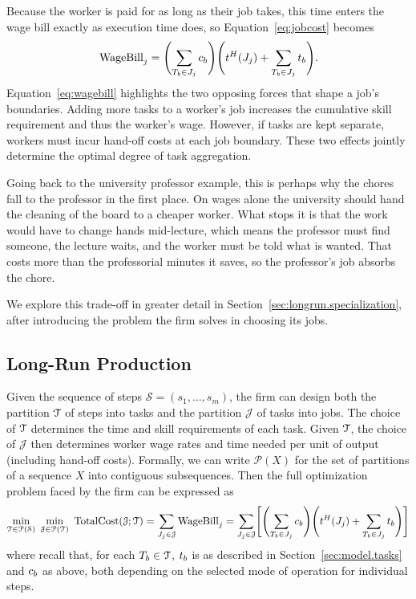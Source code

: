 Because the worker is paid for as long as their job takes, this time enters the wage bill exactly as execution time does, so Equation~\eqref{eq:jobcost} becomes
\begin{align}
\label{eq:wagebill}
\text{WageBill}_j = \Biggl(\sum_{T_b \in J_j} c_{b} \Biggr) \Biggl(t^{H}_{}(J_j) + \sum_{T_b \in J_j} t_{b} \Biggr).
\end{align}
Equation~\eqref{eq:wagebill} highlights the two opposing forces that shape a job's boundaries.
Adding more tasks to a worker's job increases the cumulative skill requirement and thus the worker's wage.
However, if tasks are kept separate, workers must incur hand-off costs at each job boundary.
These two effects jointly determine the optimal degree of task aggregation.

Going back to the university professor example, this is perhaps why the chores fall to the professor in the first place. On wages alone the university should hand the cleaning of the board to a cheaper worker. What stops it is that the work would have to change hands mid-lecture, which means the professor must find someone, the lecture waits, and the worker must be told what is wanted. That costs more than the professorial minutes it saves, so the professor's job absorbs the chore.

We explore this trade-off in greater detail in Section~\ref{sec:longrun.specialization}, after introducing the problem the firm solves in choosing its jobs.


\subsection{Long-Run Production}
\label{sec:longrun.production}

Given the sequence of steps $\mathcal{S} = (s_1, \dotsc, s_m)$, the firm can design both the partition $\mathcal{T}$ of steps into tasks and the partition $\mathcal{J}$ of tasks into jobs.
The choice of $\mathcal{T}$ determines the time and skill requirements of each task.
Given $\mathcal{T}$, the choice of $\mathcal{J}$ then determines worker wage rates and time needed per unit of output (including hand-off costs).
Formally, we can write $\mathcal{P}(X)$ for the set of partitions of a sequence $X$ into contiguous subsequences.
Then the full optimization problem faced by the firm can be expressed as
\begin{align}
\label{eq:totalcost_with_handoff}
\min_{\mathcal{T} \in \mathcal{P}(\mathcal{S})} \
\min_{\mathcal{J} \in \mathcal{P}(\mathcal{T})} \
\text{TotalCost}(\mathcal{J}; \mathcal{T})
= \sum_{J_j \in \mathcal{J}} \text{WageBill}_j =
\sum_{J_j \in \mathcal{J}} \Biggl[\Biggl(\sum_{T_b \in J_j} c_{b} \Biggr) \Biggl(t^{H}_{}(J_j) + \sum_{T_b \in J_j} t_{b} \Biggr)\Biggr]
\end{align}
where recall that, for each $T_b \in \mathcal{T}$, $t_{b}$ is as described in Section~\ref{sec:model.tasks} and $c_{b}$ as above, both depending on the selected mode of operation for individual steps.


